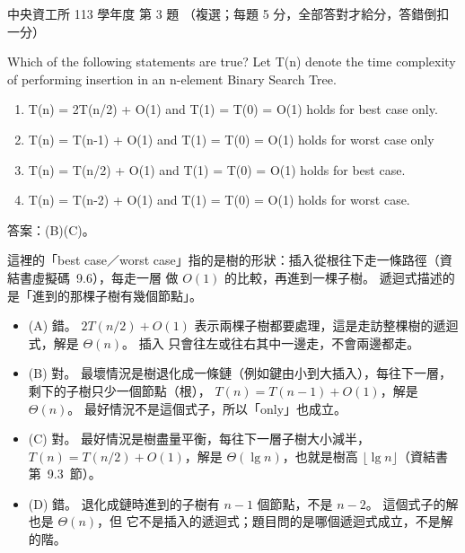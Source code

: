 \begin{pastexam}[label={px:ncu-113-dsa-03}]{中央資工所 113 學年度 第 3 題}
（複選；每題 5 分，全部答對才給分，答錯倒扣一分）

Which of the following statements are true? Let T(n) denote the time complexity of performing insertion in an
n-element Binary Search Tree.
\begin{enumerate}[label=(\Alph*)]
\item T(n) = 2T(n/2) + O(1) and T(1) = T(0) = O(1) holds for best case only.
\item T(n) = T(n-1) + O(1) and T(1) = T(0) = O(1) holds for worst case only
\item T(n) = T(n/2) + O(1) and T(1) = T(0) = O(1) holds for best case.
\item T(n) = T(n-2) + O(1) and T(1) = T(0) = O(1) holds for worst case.
\end{enumerate}
\end{pastexam}

\begin{pastsoln}
答案：(B)(C)。

這裡的「best case／worst case」指的是樹的形狀：插入從根往下走一條路徑（資結書虛擬碼~9.6），每走一層
做 $O(1)$ 的比較，再進到一棵子樹。 遞迴式描述的是「進到的那棵子樹有幾個節點」。

\begin{itemize}
\item (A) 錯。 $2T(n/2) + O(1)$ 表示兩棵子樹都要處理，這是走訪整棵樹的遞迴式，解是 $\Theta(n)$。 插入
只會往左或往右其中一邊走，不會兩邊都走。
\item (B) 對。 最壞情況是樹退化成一條鏈（例如鍵由小到大插入），每往下一層，剩下的子樹只少一個節點（根），
$T(n) = T(n-1) + O(1)$，解是 $\Theta(n)$。 最好情況不是這個式子，所以「only」也成立。
\item (C) 對。 最好情況是樹盡量平衡，每往下一層子樹大小減半，$T(n) = T(n/2) + O(1)$，解是
$\Theta(\lg n)$，也就是樹高 $\lfloor\lg n\rfloor$（資結書第~9.3~節）。
\item (D) 錯。 退化成鏈時進到的子樹有 $n - 1$ 個節點，不是 $n - 2$。 這個式子的解也是 $\Theta(n)$，但
它不是插入的遞迴式；題目問的是哪個遞迴式成立，不是解的階。
\end{itemize}
\end{pastsoln}
